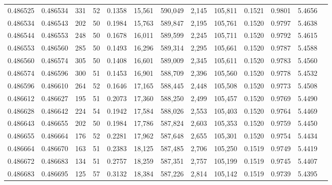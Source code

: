 \begin{tabular}{rrrrrrrrrrrrr}
0.486525 & 0.486534 & 331 &  52 &                                     0.1358 &  15,561 & 590,049 &   2,145 & 105,811 & 0.1521 & 0.9801 & 5.4656 \\
0.486534 & 0.486543 & 202 &  50 &                                     0.1984 &  15,763 & 589,847 &   2,195 & 105,761 & 0.1520 & 0.9797 & 5.4638 \\
0.486544 & 0.486553 & 248 &  50 &                                     0.1678 &  16,011 & 589,599 &   2,245 & 105,711 & 0.1520 & 0.9792 & 5.4615 \\
0.486553 & 0.486560 & 285 &  50 &                                     0.1493 &  16,296 & 589,314 &   2,295 & 105,661 & 0.1520 & 0.9787 & 5.4588 \\
0.486560 & 0.486574 & 305 &  50 &                                     0.1408 &  16,601 & 589,009 &   2,345 & 105,611 & 0.1520 & 0.9783 & 5.4560 \\
0.486574 & 0.486596 & 300 &  51 &                                     0.1453 &  16,901 & 588,709 &   2,396 & 105,560 & 0.1520 & 0.9778 & 5.4532 \\
0.486596 & 0.486610 & 264 &  52 &                                     0.1646 &  17,165 & 588,445 &   2,448 & 105,508 & 0.1520 & 0.9773 & 5.4508 \\
0.486612 & 0.486627 & 195 &  51 &                                     0.2073 &  17,360 & 588,250 &   2,499 & 105,457 & 0.1520 & 0.9769 & 5.4490 \\
0.486628 & 0.486642 & 224 &  54 &                                     0.1942 &  17,584 & 588,026 &   2,553 & 105,403 & 0.1520 & 0.9764 & 5.4469 \\
0.486643 & 0.486655 & 202 &  50 &                                     0.1984 &  17,786 & 587,824 &   2,603 & 105,353 & 0.1520 & 0.9759 & 5.4450 \\
0.486655 & 0.486664 & 176 &  52 &                                     0.2281 &  17,962 & 587,648 &   2,655 & 105,301 & 0.1520 & 0.9754 & 5.4434 \\
0.486664 & 0.486670 & 163 &  51 &                                     0.2383 &  18,125 & 587,485 &   2,706 & 105,250 & 0.1519 & 0.9749 & 5.4419 \\
0.486672 & 0.486683 & 134 &  51 &                                     0.2757 &  18,259 & 587,351 &   2,757 & 105,199 & 0.1519 & 0.9745 & 5.4407 \\
0.486683 & 0.486695 & 125 &  57 &                                     0.3132 &  18,384 & 587,226 &   2,814 & 105,142 & 0.1519 & 0.9739 & 5.4395 \\

\end{tabular}
